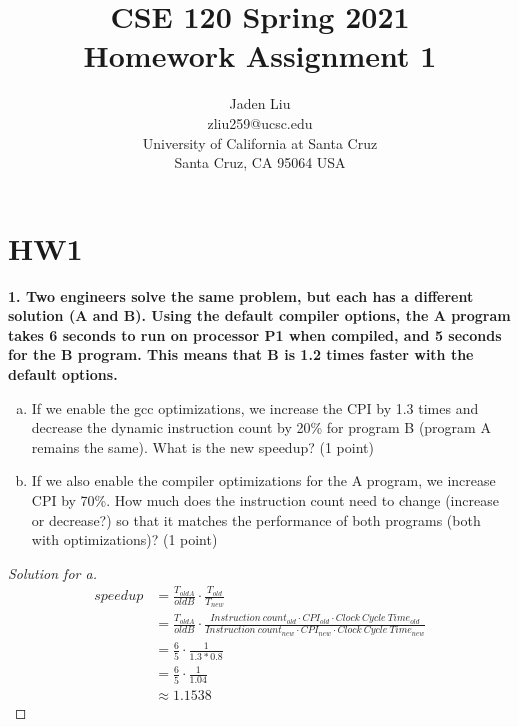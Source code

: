 \documentclass[12pt]{article}
\begin{document}
\title{ CSE 120 Spring 2021\\
	Homework Assignment 1}

\author{Jaden Liu \\
	zliu259@ucsc.edu\\ 
University of California at Santa Cruz\\
Santa Cruz, CA 95064 USA }

\maketitle


\section{HW1} 

\textbf{1. Two engineers solve the same problem, but each has a different solution (A and B). Using the default compiler options, the A program takes 6 seconds to run on processor P1 when compiled, and 5 seconds for the B program. This means that B is 1.2 times faster with the default options.
}\\
\begin{enumerate}[a)]
	\item If we enable the gcc optimizations, we increase the CPI by 1.3 times and decrease the
	dynamic instruction count by 20\% for program B (program A remains the same). What is the
	new speedup? (1 point)
	\item If we also enable the compiler optimizations for the A program, we increase CPI by 70\%. How
	much does the instruction count need to change (increase or decrease?) so that it matches the
	performance of both programs (both with optimizations)? (1 point)
\end{enumerate}

\begin{proof}[Solution for a]
	\begin{align*}
		speedup&=\frac{T_{oldA}}{oldB}\cdot\frac{T_{old}}{T_{new}}\\
		&=\frac{T_{oldA}}{oldB}\cdot\frac{Instruction\ count_{old} \cdot CPI_{old} \cdot Clock\ Cycle\ Time_{old}}{Instruction\ count_{new} \cdot CPI_{new} \cdot Clock\ Cycle\ Time_{new}}\\
		&=\frac{6}{5}\cdot\frac{1}{1.3*0.8}\\
		&=\frac{6}{5}\cdot\frac{1}{1.04}\\
		&\approx1.1538
	\end{align*}
\end{proof}
\end{document}
